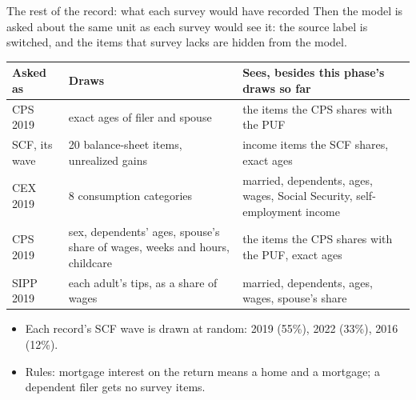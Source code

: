 \documentclass[11pt,aspectratio=169]{beamer}
\begin{document}
\begin{frame}{The rest of the record: what each survey would have recorded}
  \footnotesize
  Then the model is asked about the same unit as each survey would see it: the source label is
  switched, and the items that survey lacks are hidden from the model.

  \vspace{0.4em}
  \centering\footnotesize
  \renewcommand{\arraystretch}{1.2}
  \begin{tabular}{@{}>{\raggedright}p{2.0cm} >{\raggedright}p{5.6cm} >{\raggedright\arraybackslash}p{6.2cm}@{}}
    \toprule
    \textbf{Asked as} & \textbf{Draws} & \textbf{Sees, besides this phase's draws so far} \\
    \midrule
    CPS 2019 & exact ages of filer and spouse & the items the CPS shares with the PUF \\
    SCF, its wave & 20 balance-sheet items, unrealized gains & income items the SCF shares, exact ages \\
    CEX 2019 & 8 consumption categories & married, dependents, ages, wages, Social Security, self-employment income \\
    CPS 2019 & sex, dependents' ages, spouse's share of wages, weeks and hours, childcare & the items the CPS shares with the PUF, exact ages \\
    SIPP 2019 & each adult's tips, as a share of wages & married, dependents, ages, wages, spouse's share \\
    \bottomrule
  \end{tabular}

  \vspace{0.5em}
  \raggedright\small
  \begin{itemize}\setlength{\itemsep}{0pt}
    \item Each record's SCF wave is drawn at random: 2019 (55\%), 2022 (33\%), 2016 (12\%).
    \item Rules: mortgage interest on the return means a home and a mortgage; a dependent filer
          gets no survey items.
  \end{itemize}
\end{frame}
\end{document}
